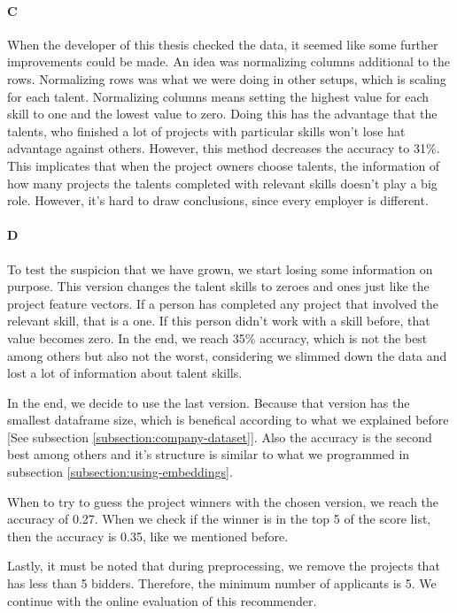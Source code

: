 \paragraph{C} When the developer of this thesis checked the data, it seemed like some further improvements could be made. An idea was normalizing columns additional to the rows. Normalizing rows was what we were doing in other setups, which is scaling for each talent. Normalizing columns means setting the highest value for each skill to one and the lowest value to zero. Doing this has the advantage that the talents, who finished a lot of projects with particular skills won't lose hat advantage against others. However, this method decreases the accuracy to 31\%. This implicates that when the project owners choose talents, the information of how many projects the talents completed with relevant skills doesn't play a big role. However, it's hard to draw conclusions, since every employer is different.

\paragraph{D} To test the suspicion that we have grown, we start losing some information on purpose. This version changes the talent skills to zeroes and ones just like the project feature vectors. If a person has completed any project that involved the relevant skill, that is a one. If this person didn't work with a skill before, that value becomes zero. In the end, we reach 35\% accuracy, which is not the best among others but also not the worst, considering we slimmed down the data and lost a lot of information about talent skills.

In the end, we decide to use the last version. Because that version has the smallest dataframe size, which is benefical according to what we explained before [See subsection \ref{subsection:company-dataset}]. Also the accuracy is the second best among others and it's structure is similar to what we programmed in subsection \ref{subsection:using-embeddings}.

When to try to guess the project winners with the chosen version, we reach the accuracy of 0.27. When we check if the winner is in the top 5 of the score list, then the accuracy is 0.35, like we mentioned before. 

 Lastly, it must be noted that during preprocessing, we remove the projects that has less than 5 bidders. Therefore, the minimum number of applicants is 5. We continue with the online evaluation of this recommender.
 
